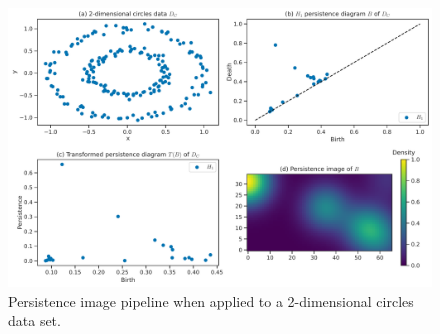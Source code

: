 \begin{figure}[H]
    \centering
    \includegraphics[width=\textwidth]{thesis/figures/persistence-image-example.pdf}
    \caption{Persistence image pipeline when applied to a 2-dimensional circles data set.}
    \label{fig:persistence-image-example}
\end{figure}

